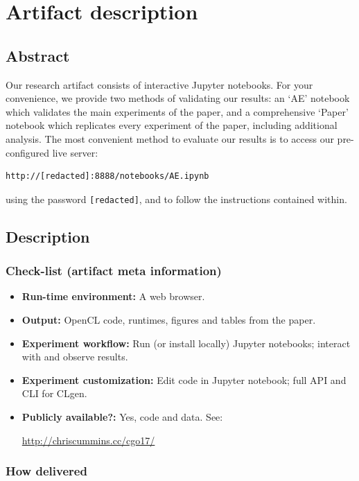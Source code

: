 \appendix

\section{Artifact description}

\subsection{Abstract}

Our research artifact consists of interactive Jupyter notebooks. For your convenience, we provide two methods of validating our results: an `AE' notebook which validates the main experiments of the paper, and a comprehensive `Paper' notebook which replicates every experiment of the paper, including additional analysis. The most convenient method to evaluate our results is to access our pre-configured live server:
\begin{verbatim}
http://[redacted]:8888/notebooks/AE.ipynb
\end{verbatim}
using the password \texttt{[redacted]}, and to follow the instructions contained within.

\subsection{Description}

\subsubsection{Check-list (artifact meta information)}

{\small
\begin{itemize}
  \item {\bf Run-time environment: }A web browser.%
  \item {\bf Output: }OpenCL code, runtimes, figures and tables from the paper.
  \item {\bf Experiment workflow: }Run (or install locally) Jupyter notebooks; interact with and observe results.
  \item {\bf Experiment customization: }Edit code in Jupyter notebook; full API and CLI for CLgen.
  \item {\bf Publicly available?: }Yes, code and data. See:
  
\url{http://chriscummins.cc/cgo17/}
\end{itemize}
}

\subsubsection{How delivered}

